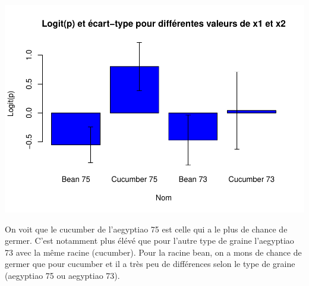 \documentclass[
]{article}
\begin{document}
\begin{center}\includegraphics{projet1---rapport_files/figure-latex/unnamed-chunk-2-1} \end{center}

On voit que le cucumber de l'aegyptiao 75 est celle qui a le plus de
chance de germer. C'est notamment plus élévé que pour l'autre type de
graine l'aegyptiao 73 avec la même racine (cucumber). Pour la racine
bean, on a mons de chance de germer que pour cucumber et il a très peu
de différences selon le type de graine (aegyptiao 75 ou aegyptiao 73).
\end{document}
